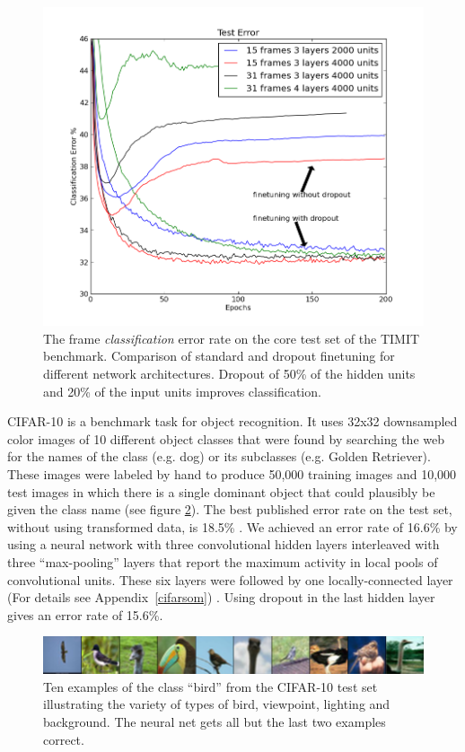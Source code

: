 \documentclass[12pt]{article}
\begin{document}
\begin{figure}[t!]
\centerline{\includegraphics[scale = 0.40]{timit.png}}
\caption{The frame {\it classification} error rate on the core test set of the TIMIT
  benchmark. Comparison of standard and dropout finetuning for different network
  architectures. Dropout of 50\% of the hidden 
  units and 20\% of the input units improves classification.}
\label{fig:timitplot}
\end{figure}

CIFAR-10 is a benchmark task for object recognition. It uses 32x32 downsampled color
images of 10 different object classes that were found by searching the web for the names
of the class (e.g. dog) or its subclasses (e.g. Golden Retriever). These images were
labeled by hand to produce 50,000 training images and 10,000 test images in which there is
a single dominant object that could plausibly be given the class name \cite{kriz} (see
figure \ref{fig:cifar}). The best published error rate on the test set, without using
transformed data, is 18.5\% \cite{Coates2011}. We achieved an error rate of 16.6\% by using a
neural network with three convolutional hidden layers interleaved with three
``max-pooling'' layers that report the maximum activity in local pools of convolutional
units. These six layers were followed by one locally-connected layer (For details see Appendix~\ref{cifarsom}) . Using
dropout in the last hidden layer gives an error rate of 15.6\%.

\begin{figure}[t]
\centerline{\includegraphics[scale=0.4]{birds-10.png}}
\caption{Ten examples of the class ``bird'' from the CIFAR-10 test set illustrating the
  variety of types of bird, viewpoint, lighting and background. The neural net gets all
  but the last two examples correct.}
\label{fig:cifar}
\end{figure}
\end{document}
